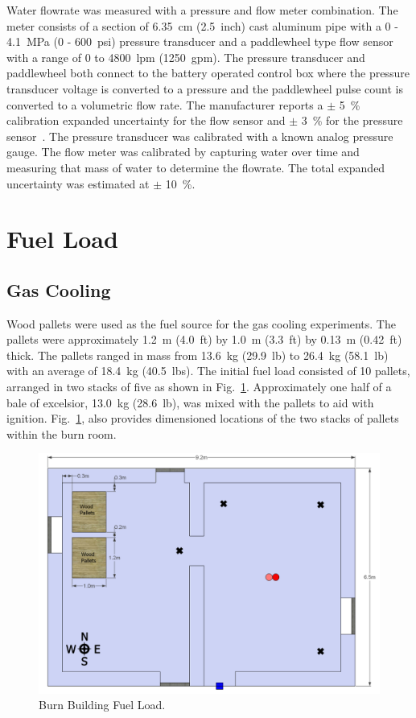 \documentclass[12pt,oneside]{book}
\begin{document}
Water flowrate was measured with a pressure and flow meter combination. The meter consists of a section of 6.35~cm (2.5~inch) cast aluminum pipe with a 0 - 4.1~MPa (0 - 600~psi) pressure transducer and a paddlewheel type flow sensor with a range of 0 to 4800~lpm (1250~gpm). The pressure transducer and paddlewheel both connect to the battery operated control box where the pressure transducer voltage is converted to a pressure and the paddlewheel pulse count is converted to a volumetric flow rate.  The manufacturer reports a $\pm$ 5~\% calibration expanded uncertainty for the flow sensor and $\pm$ 3~\%  for the pressure sensor~\cite{Akron:2009}. The pressure transducer was calibrated with a known analog pressure gauge. The flow meter was calibrated by capturing water over time and measuring that mass of water to determine the flowrate. The total expanded uncertainty was estimated at $\pm$ 10~\%.

\section{Fuel Load}
\label{sec:fuel_load}

\subsection{Gas Cooling}
\label{sec:Fuel_Load_Gas_Cooling}

Wood pallets were used as the fuel source for the gas cooling experiments. The pallets were approximately 1.2~m (4.0~ft) by 1.0~m (3.3~ft) by 0.13~m (0.42~ft) thick. The pallets ranged in mass from 13.6~kg (29.9~lb) to 26.4~kg (58.1~lb) with an average of 18.4~kg (40.5~lbs). The initial fuel load consisted of 10 pallets, arranged in two stacks of five as shown in Fig.~\ref{fig:Burn_Building_Fuel_Load}. Approximately one half of a bale of excelsior, 13.0~kg (28.6~lb), was mixed with the pallets to aid with ignition. Fig.~\ref{fig:Burn_Building_Fuel_Load}, also provides dimensioned locations of the two stacks of pallets within the burn room.

\begin{figure}[!ht]
	\includegraphics[width=6in]{../Figures/Pictures/DelCoBurnBuildingFuelLoad}
	\caption{Burn Building Fuel Load.}
	\label{fig:Burn_Building_Fuel_Load}
\end{figure}
\end{document}
